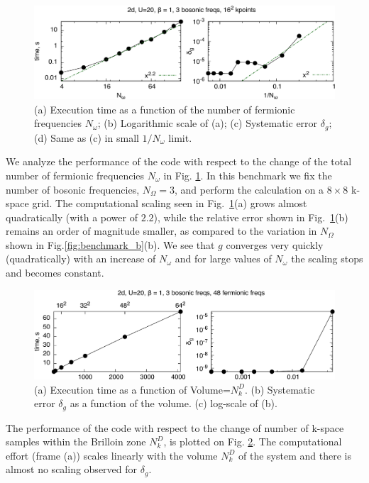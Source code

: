 \documentclass[3p,times,procedia]{elsarticle}
\begin{document}
\begin{figure}[ht]
\includegraphics[width=1.0\columnwidth]{time_ffreqs.pdf}
\caption{(a) Execution time as a function of the number of fermionic frequencies $N_{\omega}$; (b) Logarithmic scale of (a); (c) Systematic error $\delta_g$; (d) Same as (c) in small $1/N_{\omega}$ limit.}
\label{fig:benchmark_f}
\end{figure}

We analyze the performance of the code with respect to the change of the total number of fermionic frequencies $N_{\omega}$  in Fig. \ref{fig:benchmark_f}.  In this benchmark we fix the number of bosonic frequencies, $N_{\Omega}=3$, and perform the calculation on a $8\times8$ k-space grid. The computational scaling seen in Fig.~\ref{fig:benchmark_f}(a)  grows almost quadratically (with a power of $2.2$), while the relative error shown in Fig.~\ref{fig:benchmark_f}(b) remains an order of magnitude smaller, as compared to the variation in $N_{\Omega}$ shown in Fig.\ref{fig:benchmark_b}(b). We see that $g$ converges very quickly (quadratically) with an increase of $N_{\omega}$ and for large values of $N_{\omega}$ the scaling stops and becomes constant.

\begin{figure}[ht]
\includegraphics[width=1.0\columnwidth]{time_kpts.pdf}
\caption{(a) Execution time as a function of Volume=$N_k^D$. (b) Systematic error $\delta_g$ as a function of the volume. (c) log-scale of (b).}
\label{fig:benchmark_kpts}
\end{figure}

The performance of the code with respect to the change of number of k-space samples within the Brilloin zone $N_k^D$, is plotted on Fig. \ref{fig:benchmark_kpts}. The computational effort (frame (a)) scales linearly with the volume $N_k^D$ of the system and there is almost no scaling observed for $\delta_g$.
\end{document}
